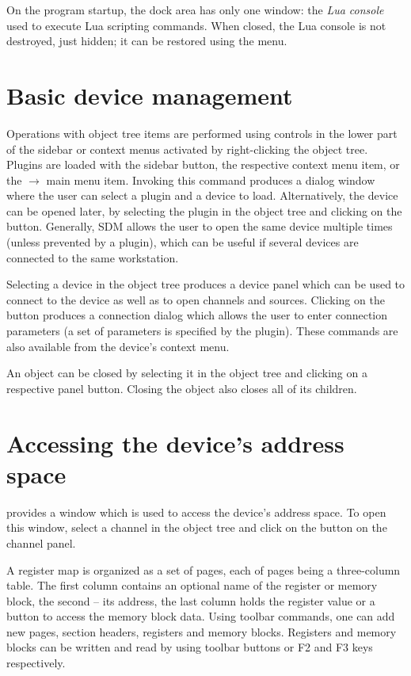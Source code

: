 \documentclass[a4paper,12pt,twoside,extrafontsizes]{memoir}
\begin{document}
On the program startup, the dock area has only one window: the \emph{Lua console} used to execute Lua scripting commands. When closed, the Lua console is not destroyed, just hidden; it can be restored using the  menu.

\section{Basic device management}

Operations with object tree items are performed using controls in the lower part of the sidebar or context menus activated by right-clicking the object tree. Plugins are loaded with the  sidebar button, the respective context menu item, or the  $\rightarrow$  main menu item. Invoking this command produces a dialog window where the user can select a plugin and a device to load. Alternatively, the device can be opened later, by selecting the plugin in the object tree and clicking on the  button. Generally, SDM allows the user to open the same device multiple times (unless prevented by a plugin), which can be useful if several devices are connected to the same workstation.

Selecting a device in the object tree produces a device panel which can be used to connect to the device as well as to open channels and sources. Clicking on the  button produces a connection dialog which allows the user to enter connection parameters (a set of parameters is specified by the plugin). These commands are also available from the device's context menu.

An object can be closed by selecting it in the object tree and clicking on a respective panel button. Closing the object also closes all of its children.

\section{Accessing the device's address space}

 provides a  window which is used to access the device's address space. To open this window, select a channel in the object tree and click on the  button on the channel panel.

A register map is organized as a set of pages, each of pages being a three-column table. The first column contains an optional name of the register or memory block, the second -- its address, the last column holds the register value or a button to access the memory block data. Using toolbar commands, one can add new pages, section headers, registers and memory blocks. Registers and memory blocks can be written and read by using toolbar buttons or F2 and F3 keys respectively.
\end{document}
